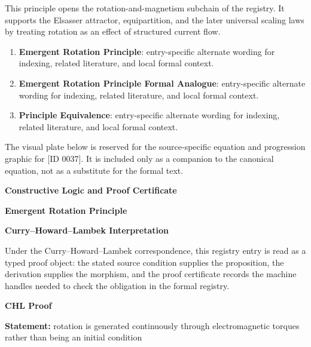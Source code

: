 This principle opens the rotation-and-magnetism subchain of the registry. It supports the Elsasser attractor, equipartition, and the later universal scaling laws by treating rotation as an effect of structured current flow.
\endgroup

\begingroup\footnotesize\sloppy
\begin{enumerate}[leftmargin=1.35em,itemsep=1pt,topsep=1pt,parsep=0pt]
\item \textbf{Emergent Rotation Principle}: entry-specific alternate wording for indexing, related literature, and local formal context.
\item \textbf{Emergent Rotation Principle Formal Analogue}: entry-specific alternate wording for indexing, related literature, and local formal context.
\item \textbf{Principle Equivalence}: entry-specific alternate wording for indexing, related literature, and local formal context.
\end{enumerate}
\endgroup

\begingroup\footnotesize\sloppy
The visual plate below is reserved for the source-specific equation and progression graphic for [ID 0037]. It is included only as a companion to the canonical equation, not as a substitute for the formal text.
\par\endgroup
\ifTZPDarkEdition
{}
\fi

\clearpage
\begingroup\tzpsupportsetup
\noindent\textbf{\fontsize{10.8pt}{12.8pt}\selectfont [ID 0037] Constructive Logic and Proof Certificate}\par
\noindent\textbf{\fontsize{10pt}{12pt}\selectfont Emergent Rotation Principle}\par
\vspace{0.45em}
\begingroup
\footnotesize
\setlength{\parskip}{0.22em}
\setlength{\parindent}{0pt}
\noindent\textbf{Curry--Howard--Lambek Interpretation}\par
Under the Curry--Howard--Lambek correspondence, this registry entry is read as a typed proof
object: the stated source condition supplies the proposition, the derivation supplies the
morphism, and the proof certificate records the machine handles needed to check the obligation
in the formal registry.

\vspace{0.45em}
\noindent\textbf{CHL Proof}\par
\textbf{Statement:} rotation is generated continuously through electromagnetic torques rather than being an
initial condition

